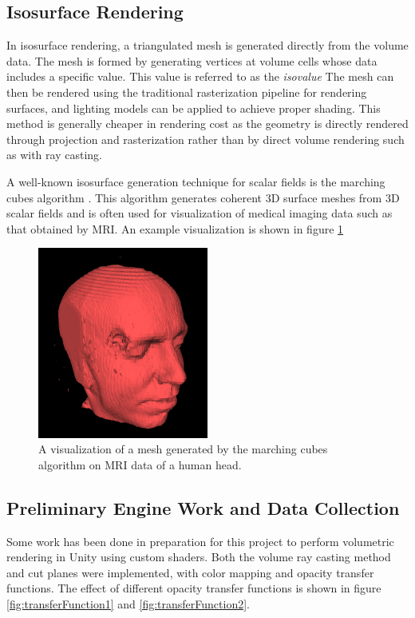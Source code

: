 \documentclass{article}
\begin{document}
\subsection{Isosurface Rendering}
In isosurface rendering, a triangulated mesh is generated directly from the volume data.
The mesh is formed by generating vertices at volume cells whose data includes a specific value.
This value is referred to as the \textit{isovalue}
The mesh can then be rendered using the traditional rasterization pipeline for rendering surfaces, and 
lighting models can be applied to achieve proper shading. This method is generally cheaper in rendering cost as the
geometry is directly rendered through projection and rasterization rather than by direct volume rendering such as with
ray casting.

A well-known isosurface generation technique for scalar fields is the marching cubes algorithm \cite{lorensen1987marching}.
This algorithm generates coherent 3D surface meshes from 3D scalar fields and is often used for visualization of medical imaging
data such as that obtained by MRI. An example visualization is shown in figure \ref{fig:marchingCubesMRI}

\begin{figure}[tbh]
    \centering
    \includegraphics[width=0.5\textwidth]{images/Marchingcubes-head.png}
    \caption{A visualization of a mesh generated by the marching cubes algorithm on MRI data of a human head.}
    \label{fig:marchingCubesMRI}
\end{figure}


\subsection{Preliminary Engine Work and Data Collection}
Some work has been done in preparation for this project to perform volumetric
rendering in Unity using custom shaders. Both the volume ray casting method and 
cut planes were implemented, with color mapping and opacity transfer functions.
The effect of different opacity transfer functions is shown in figure \ref{fig:transferFunction1} and 
\ref{fig:transferFunction2}.
\end{document}
